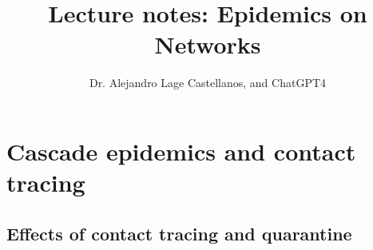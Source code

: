 \documentclass[a4paper,10pt]{book}
\title{Lecture notes: Epidemics on Networks}
\author{Dr. Alejandro Lage Castellanos, and ChatGPT4}
\newcommand{\1}{\mathbb I}
\begin{document}
\maketitle
\tableofcontents
% 
% 

 
 
 
 
 


\chapter{Cascade epidemics and contact tracing}

\section{Effects of contact tracing and quarantine}
\end{document}
